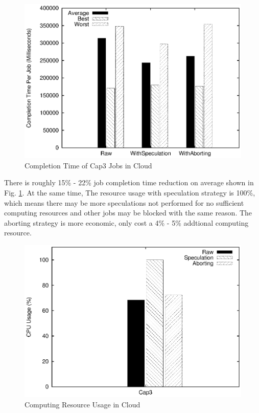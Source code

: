 \begin{figure}
\centering
\includegraphics[width=0.9\columnwidth]{figures/cloud_completiontime_cap3.eps}
\caption{Completion Time of Cap3 Jobs in Cloud}
\label{figure:completiontime_cap3_cloud}
\end{figure}

There is roughly 15\% - 22\% job completion time reduction on average shown in Fig. \ref{figure:completiontime_cap3_cloud}. At the same time, The resource usage with speculation strategy is 100\%, which means there may be more speculations not performed for no sufficient computing resources and other jobs may be blocked with the same reason. The aborting strategy is more economic, only cost a 4\% - 5\% addtional computing resource.

\begin{figure}
\centering
\includegraphics[width=0.9\columnwidth]{figures/cloud_resource_usage.eps}
\caption{Computing Resource Usage in Cloud}
\label{figure:resourceusage_cloud}
\end{figure}

